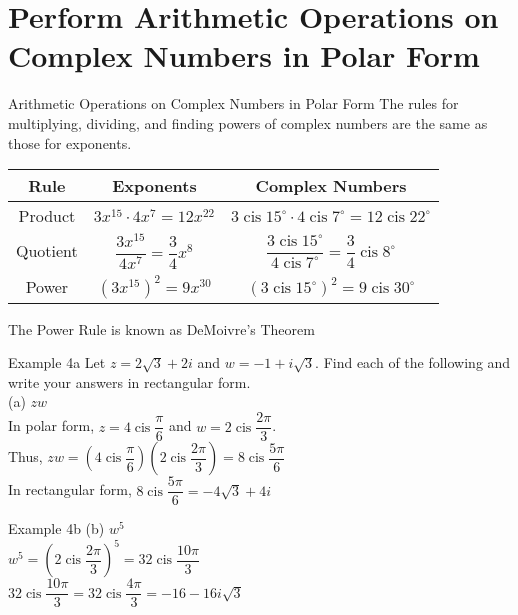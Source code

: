 \documentclass[t,usenames,dvipsnames]{beamer}
\DeclareMathOperator\cis{cis}
\begin{document}
\section{Perform Arithmetic Operations on Complex Numbers in Polar Form}

\begin{frame}{Arithmetic Operations on Complex Numbers in Polar Form}
The rules for multiplying, dividing, and finding powers of complex numbers are the same as those for exponents.    \newline\\
\pause 

\setlength{\extrarowheight}{10pt}
\begin{tabular}{ccc}
    \textbf{Rule} & \textbf{Exponents} & \textbf{Complex Numbers}    \\ \hline
    Product & $3x^{15}\cdot 4x^7 = 12x^{22}$ & $3\cis15^\circ \cdot 4 \cis 7^\circ = 12 \cis 22^\circ$ \\[10pt]
    Quotient & $\dfrac{3x^{15}}{4x^7} = \dfrac{3}{4}x^8$ &
    $\dfrac{3\cis15^\circ}{4\cis7^\circ} = \dfrac{3}{4}\cis 8^\circ$ \\[10pt] 
    Power & $(3x^{15})^2 = 9x^{30}$ & $(3\cis15^\circ)^2 = 9\cis30^\circ$ \\[15pt]
\end{tabular}

The Power Rule is known as DeMoivre's Theorem
\end{frame}

\begin{frame}{Example 4a}
    Let $z=2\sqrt{3}+2i$ and $w=-1+i\sqrt{3}$. Find each of the following and write your answers in rectangular form.    \newline\\
    (a) \quad $zw$  \newline\\
    \pause
    In polar form, $z=4\cis\dfrac{\pi}{6}$ and $w=2\cis\dfrac{2\pi}{3}$.   \\[15pt]  \pause
    Thus, $zw = \left(4\cis\dfrac{\pi}{6}\right)\left(2\cis\dfrac{2\pi}{3}\right)=8\cis\dfrac{5\pi}{6}$   \\[15pt]  \pause
    In rectangular form, $8\cis\dfrac{5\pi}{6} = -4\sqrt{3} + 4i$
\end{frame}

\begin{frame}{Example 4b}
    (b) \quad $w^5$ \newline\\
    \pause
    $w^5 = \left(2\cis\dfrac{2\pi}{3}\right)^5 = 32\cis\dfrac{10\pi}{3}$  \\[15pt]   \pause
    $32\cis\dfrac{10\pi}{3} = 32\cis\dfrac{4\pi}{3}=-16-16i\sqrt{3}$
\end{frame}
\end{document}
